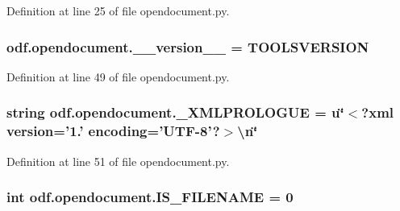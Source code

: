 Definition at line 25 of file opendocument.\+py.

\hypertarget{namespaceodf_1_1opendocument_a7ae7b9f7ff753deece3ec6f05a9104ee}{
\subsubsection[{\+\_\+\+\_\+version\+\_\+\+\_\+}]{\setlength{\rightskip}{0pt plus 5cm}odf.\+opendocument.\+\_\+\+\_\+version\+\_\+\+\_\+ = T\+O\+O\+L\+S\+V\+E\+R\+S\+I\+O\+N}}\label{namespaceodf_1_1opendocument_a7ae7b9f7ff753deece3ec6f05a9104ee}


Definition at line 49 of file opendocument.\+py.

\hypertarget{namespaceodf_1_1opendocument_a2598e2e2f5849be1876f9a585f8359dd}{
\subsubsection[{\+\_\+\+X\+M\+L\+P\+R\+O\+L\+O\+G\+U\+E}]{\setlength{\rightskip}{0pt plus 5cm}string odf.\+opendocument.\+\_\+\+X\+M\+L\+P\+R\+O\+L\+O\+G\+U\+E = u\char`\"{}$<$?xml version='1.' encoding='U\+T\+F-\/8'?$>$\textbackslash{}n\char`\"{}}}\label{namespaceodf_1_1opendocument_a2598e2e2f5849be1876f9a585f8359dd}


Definition at line 51 of file opendocument.\+py.

\hypertarget{namespaceodf_1_1opendocument_a16a01c597acdbd785c45dc2c8abf6e99}{
\subsubsection[{I\+S\+\_\+\+F\+I\+L\+E\+N\+A\+M\+E}]{\setlength{\rightskip}{0pt plus 5cm}int odf.\+opendocument.\+I\+S\+\_\+\+F\+I\+L\+E\+N\+A\+M\+E = 0}}\label{namespaceodf_1_1opendocument_a16a01c597acdbd785c45dc2c8abf6e99}


